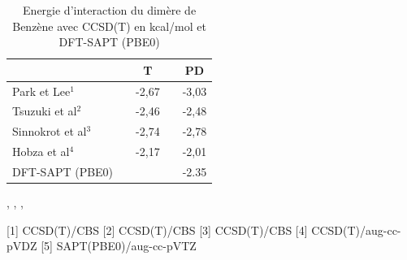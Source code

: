    					
   					
   					\begin{table}[H]
   						\caption{Energie d'interaction du dimère de Benzène avec CCSD(T) en kcal/mol et DFT-SAPT (PBE0)}
   						\begin{center}
   							\begin{tabular}{l c c c c}
   								\toprule
   								& & T& & PD\\
   								\midrule
   								Park et Lee$^{1}$ & & -2,67& &-3,03\\
   								Tsuzuki et al$^{2}$ & & -2,46& & -2,48\\
   								Sinnokrot et al$^{3}$ & & -2,74& & -2,78\\
   								Hobza et al$^{4}$ & & -2,17& & -2,01\\
   								DFT-SAPT (PBE0) & & & & -2.35\\
   								\bottomrule
   							\end{tabular}
   						\end{center}
   						\centering
   						,
   						,
   						,
   						
   						[1] CCSD(T)/CBS
   						[2] CCSD(T)/CBS 
   						[3] CCSD(T)/CBS
   						[4] CCSD(T)/aug-cc-pVDZ
   						[5] SAPT(PBE0)/aug-cc-pVTZ
   						
   						
   						\label{benzene}
   					\end{table}
   					



